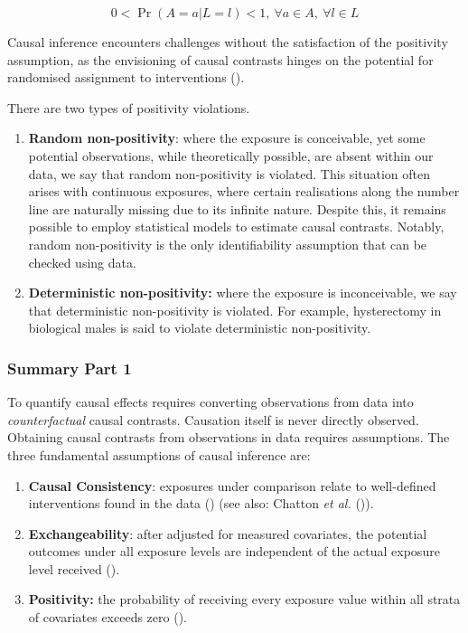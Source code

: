 \documentclass[
  singlecolumn,
  9pt]{article}
\begin{document}
\[
0 < \Pr(A=a|L=l)<1, ~ \forall a \in A, ~ \forall l \in L
\]

Causal inference encounters challenges without the satisfaction of the
positivity assumption, as the envisioning of causal contrasts hinges on
the potential for randomised assignment to interventions
().

There are two types of positivity violations.

\begin{enumerate}
\def\labelenumi{\arabic{enumi}.}
\item
  \textbf{Random non-positivity}: where the exposure is conceivable, yet
  some potential observations, while theoretically possible, are absent
  within our data, we say that random non-positivity is violated. This
  situation often arises with continuous exposures, where certain
  realisations along the number line are naturally missing due to its
  infinite nature. Despite this, it remains possible to employ
  statistical models to estimate causal contrasts. Notably, random
  non-positivity is the only identifiability assumption that can be
  checked using data.
\item
  \textbf{Deterministic non-positivity:} where the exposure is
  inconceivable, we say that deterministic non-positivity is violated.
  For example, hysterectomy in biological males is said to violate
  deterministic non-positivity.
\end{enumerate}

\subsubsection{Summary Part 1}\label{summary-part-1}

To quantify causal effects requires converting observations from data
into \emph{counterfactual} causal contrasts. Causation itself is never
directly observed. Obtaining causal contrasts from observations in data
requires assumptions. The three fundamental assumptions of causal
inference are:

\begin{enumerate}
\def\labelenumi{\arabic{enumi}.}
\item
  \textbf{Causal Consistency}: exposures under comparison relate to
  well-defined interventions found in the data
  () (see also:
  Chatton \emph{et al.} ()).
\item
  \textbf{Exchangeability}: after adjusted for measured covariates, the
  potential outcomes under all exposure levels are independent of the
  actual exposure level received ().
\item
  \textbf{Positivity:} the probability of receiving every exposure value
  within all strata of covariates exceeds zero
  ().
\end{enumerate}
\end{document}
